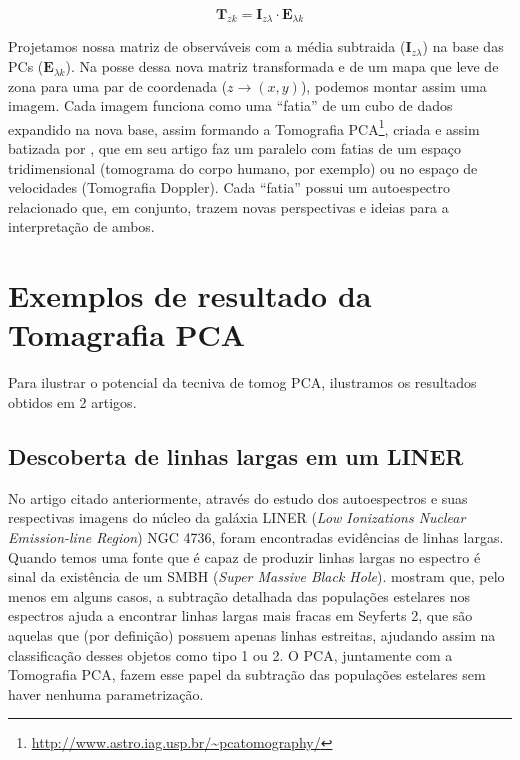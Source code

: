\begin{equation}
	\label{eq:TomoPCA:tomogram2D}
	\mathbf{T}{}_{z k} = \mathbf{I}{}_{z \lambda} \cdot \mathbf{E}{}_{\lambda k}
\end{equation}

Projetamos nossa matriz de observáveis com a média subtraida ($\mathbf{I}{}_{z
\lambda}$) na base das PCs ($\mathbf{E}{}_{\lambda k}$). Na posse dessa nova
matriz transformada e de um mapa que leve de zona para uma par de coordenada ($z
\to (x, y)$), podemos montar assim uma imagem. Cada imagem funciona como uma
``fatia'' de um cubo de dados expandido na nova base, assim formando a
Tomografia PCA\footnote{\url{http://www.astro.iag.usp.br/~pcatomography/}},
criada e assim batizada por \citet{Steiner2009}, que em seu artigo faz um
paralelo com fatias de um espaço tridimensional (tomograma do corpo humano, por
exemplo) ou no espaço de velocidades (Tomografia Doppler). Cada ``fatia'' possui
um autoespectro relacionado que, em conjunto, trazem novas perspectivas e ideias
para a interpretação de ambos. 




\section{Exemplos de resultado da Tomagrafia PCA}

Para ilustrar o potencial da tecniva de tomog PCA, ilustramos os resultados obtidos em 2 artigos.

\subsection{Descoberta de linhas largas em um LINER}

No artigo citado anteriormente, através do estudo dos autoespectros e suas
respectivas imagens do núcleo da galáxia LINER ({\em Low Ionizations Nuclear
Emission-line Region}) NGC 4736, foram encontradas evidências de linhas largas. Quando temos uma fonte que é capaz de
produzir linhas largas no espectro é sinal da existência de um SMBH ({\em Super
Massive Black Hole}). \citet{CidFernandes2004} mostram que, pelo menos em alguns casos, a subtração 
detalhada das populações estelares nos espectros ajuda a encontrar linhas largas
mais fracas em Seyferts 2, que são aquelas que (por definição)  possuem apenas linhas estreitas,
ajudando assim na classificação desses objetos como tipo 1 ou 2. O PCA,
juntamente com a Tomografia PCA, fazem esse papel da subtração das populações
estelares sem haver nenhuma parametrização.

